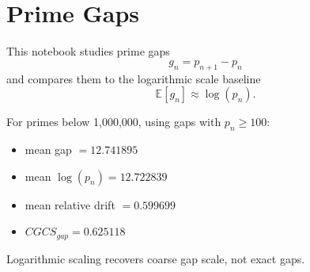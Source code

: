 \section*{Prime Gaps}

This notebook studies prime gaps
\[
g_n = p_{n+1} - p_n
\]
and compares them to the logarithmic scale baseline
\[
\mathbb{E}[g_n] \approx \log(p_n).
\]

For primes below 1,000,000, using gaps with $p_n \ge 100$:
\begin{itemize}
  \item mean gap $= 12.741895$
  \item mean $\log(p_n) = 12.722839$
  \item mean relative drift $= 0.599699$
  \item $CGCS_{gap} = 0.625118$
\end{itemize}

Logarithmic scaling recovers coarse gap scale, not exact gaps.
